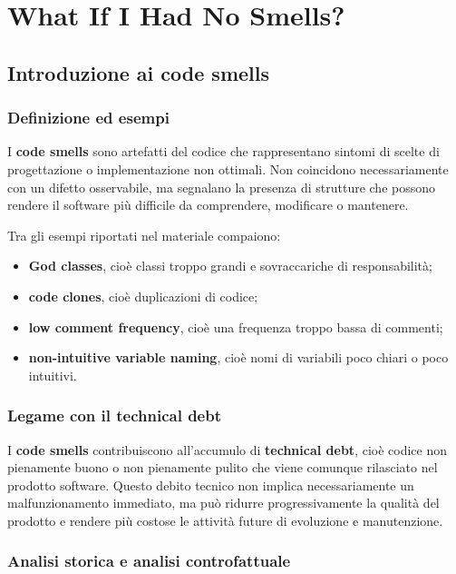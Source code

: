 \chapter{What If I Had No Smells?}

\section{Introduzione ai code smells}

\subsection{Definizione ed esempi}

I \textbf{code smells} sono artefatti del codice che rappresentano sintomi di scelte di progettazione o implementazione non ottimali. Non coincidono necessariamente con un difetto osservabile, ma segnalano la presenza di strutture che possono rendere il software più difficile da comprendere, modificare o mantenere.

Tra gli esempi riportati nel materiale compaiono:

\begin{itemize}
    \item \textbf{God classes}, cioè classi troppo grandi e sovraccariche di responsabilità;
    \item \textbf{code clones}, cioè duplicazioni di codice;
    \item \textbf{low comment frequency}, cioè una frequenza troppo bassa di commenti;
    \item \textbf{non-intuitive variable naming}, cioè nomi di variabili poco chiari o poco intuitivi.
\end{itemize}

\subsection{Legame con il technical debt}

I \textbf{code smells} contribuiscono all'accumulo di \textbf{technical debt}, cioè codice non pienamente buono o non pienamente pulito che viene comunque rilasciato nel prodotto software. Questo debito tecnico non implica necessariamente un malfunzionamento immediato, ma può ridurre progressivamente la qualità del prodotto e rendere più costose le attività future di evoluzione e manutenzione.

\subsection{Analisi storica e analisi controfattuale}

